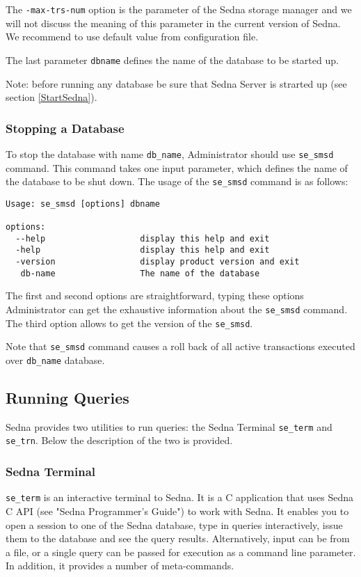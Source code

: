 \documentclass[a4paper,12pt]{article}
\begin{document}
The \verb!-max-trs-num! option is the parameter of the Sedna storage manager and we will not discuss the meaning of this parameter in the current version of Sedna. We recommend to use default value from configuration file.


The last parameter \verb!dbname!  defines the name of the database to be started up. 


Note: before running any database be sure that Sedna Server is strarted up (see section \ref{StartSedna}).

\subsubsection{Stopping a Database}

To stop the database with name \verb!db_name!, Administrator should use \verb!se_smsd! command. This command takes one input parameter, which defines the name of the database to be shut down. The usage of the \verb!se_smsd! command is as follows:

\begin{verbatim}
Usage: se_smsd [options] dbname

options:
  --help                   display this help and exit
  -help                    display this help and exit
  -version                 display product version and exit
   db-name                 The name of the database
\end{verbatim}

The first and second options are straightforward, typing these options Administrator can get the exhaustive information about the \verb!se_smsd! command.
The third option allows to get the version of the \verb!se_smsd!.

Note that \verb!se_smsd! command causes a roll back of all active transactions executed over \verb!db_name! database.


\subsection{Running Queries}
Sedna provides two utilities to run queries: the Sedna Terminal \verb!se_term! and \verb!se_trn!. Below the description of the two is provided.

\subsubsection{Sedna Terminal}
\verb!se_term! is an interactive terminal to Sedna. It is a C application that uses Sedna C API (see "Sedna Programmer's Guide") to work with Sedna. It enables you to open a session to one of the Sedna database, type in queries interactively, issue them to the database and see the query results. Alternatively, input can be from a file, or a single query can be passed for execution as a command line parameter. In addition, it provides a number of meta-commands. 
\end{document}
